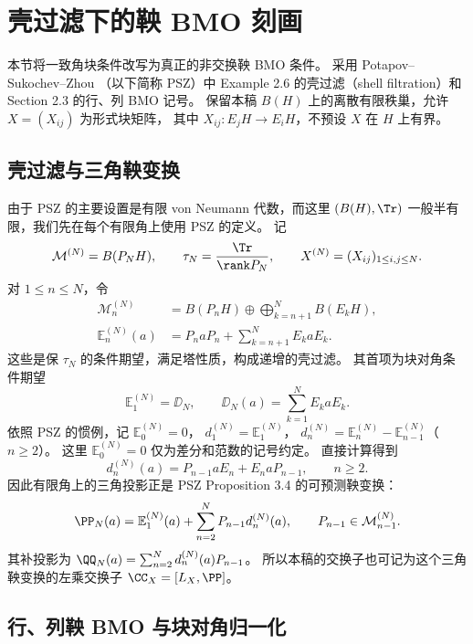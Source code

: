 \section{壳过滤下的鞅 BMO 刻画}\label{sec:martingale}

本节将一致角块条件改写为真正的非交换鞅 BMO 条件。
采用 Potapov--Sukochev--Zhou \cite{PSZ}（以下简称 PSZ）中
Example 2.6 的壳过滤（shell filtration）和 Section 2.3 的行、列 BMO 记号。
保留本稿 $B(H)$ 上的离散有限秩巢，允许 $X=(X_{ij})$ 为形式块矩阵，
其中 $X_{ij}:E_jH\to E_iH$，不预设 $X$ 在 $H$ 上有界。

\subsection{壳过滤与三角鞅变换}

由于 PSZ 的主要设置是有限 von Neumann 代数，而这里
$(B(H),\Tr)$ 一般半有限，我们先在每个有限角上使用 PSZ 的定义。
记
\[
 \mathcal M^{(N)}=B(P_NH),\qquad
 \tau_N=\frac{\Tr}{\rank P_N},\qquad
 X^{(N)}=(X_{ij})_{1\leq i,j\leq N}.
\]
对 $1\leq n\leq N$，令
\begin{align}
 \mathcal M_n^{(N)}
 &=B(P_nH)\oplus\bigoplus_{k=n+1}^{N}B(E_kH),\label{eq:shell-algebra}\\
 \mathbb E_n^{(N)}(a)
 &=P_naP_n+\sum_{k=n+1}^{N}E_kaE_k.\label{eq:shell-expectation}
\end{align}
这些是保 $\tau_N$ 的条件期望，满足塔性质，构成递增的壳过滤。
其首项为块对角条件期望
\[
 \mathbb E_1^{(N)}=\DD_N,\qquad
 \DD_N(a)=\sum_{k=1}^{N}E_kaE_k.
\]
依照 PSZ 的惯例，记 $\mathbb E_0^{(N)}=0$，
$d_1^{(N)}=\mathbb E_1^{(N)}$，
$d_n^{(N)}=\mathbb E_n^{(N)}-\mathbb E_{n-1}^{(N)}$（$n\geq2$）。
这里 $\mathbb E_0^{(N)}=0$ 仅为差分和范数的记号约定。
直接计算得到
\begin{equation}\label{eq:shell-difference}
 d_n^{(N)}(a)=P_{n-1}aE_n+E_naP_{n-1},\qquad n\geq2.
\end{equation}
因此有限角上的三角投影正是 PSZ Proposition 3.4 的可预测鞅变换：
\begin{equation}\label{eq:martingale-transform}
 \PP_N(a)=\mathbb E_1^{(N)}(a)
       +\sum_{n=2}^{N}P_{n-1}d_n^{(N)}(a),
 \qquad P_{n-1}\in\mathcal M_{n-1}^{(N)}.
\end{equation}
其补投影为 $\QQ_N(a)=\sum_{n=2}^{N}d_n^{(N)}(a)P_{n-1}$。
所以本稿的交换子也可记为这个三角鞅变换的左乘交换子
$\CC_X=[L_X,\PP]$。

\subsection{行、列鞅 BMO 与块对角归一化}

